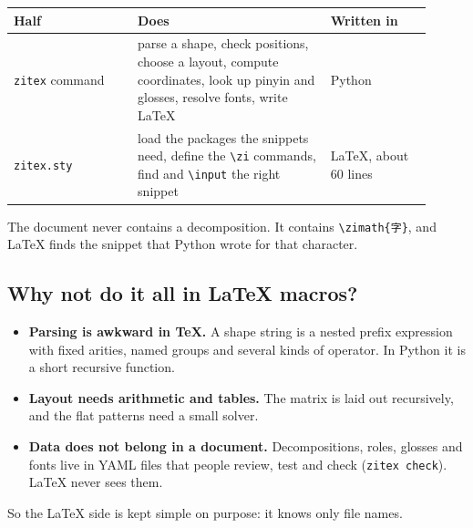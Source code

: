 \documentclass[11pt]{article}
\newcommand{\cmd}[1]{\texttt{\textbackslash #1}}               %
\begin{document}
\begin{center}
\small
\begin{tabular}{@{}p{0.27\linewidth}p{0.42\linewidth}p{0.22\linewidth}@{}}
\toprule
Half & Does & Written in \\
\midrule
\texttt{zitex} command & parse a shape, check positions, choose a layout, compute coordinates, look up pinyin and glosses, resolve fonts, write \LaTeX{} & Python \\
\texttt{zitex.sty} & load the packages the snippets need, define the \cmd{zi} commands, find and \cmd{input} the right snippet & \LaTeX{}, about 60 lines \\
\bottomrule
\end{tabular}
\end{center}

The document never contains a decomposition. It contains \cmd{zimath}\texttt{\{字\}}, and \LaTeX{} finds the snippet that Python wrote for that character.

\subsection{Why not do it all in \LaTeX{} macros?}
\begin{itemize}
  \item \textbf{Parsing is awkward in \TeX.} A shape string is a nested prefix expression with fixed arities, named groups and several kinds of operator. In Python it is a short recursive function.
  \item \textbf{Layout needs arithmetic and tables.} The matrix is laid out recursively, and the flat patterns need a small solver.
  \item \textbf{Data does not belong in a document.} Decompositions, roles, glosses and fonts live in YAML files that people review, test and check (\texttt{zitex check}). \LaTeX{} never sees them.
\end{itemize}
So the \LaTeX{} side is kept simple on purpose: it knows only file names.
\end{document}
